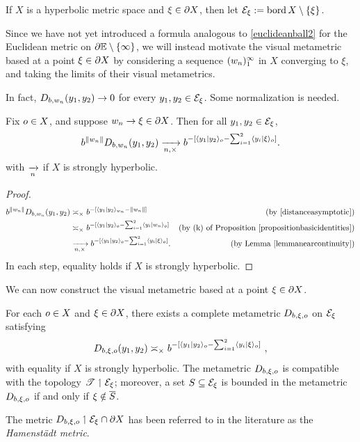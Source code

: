 \begin{notation}
If $X$ is a hyperbolic metric space and $\xi\in\partial X$, then let $\mathcal E_\xi := \operatorname{bord} X\setminus\{\xi\}$.
\end{notation}

Since we have not yet introduced a formula analogous to \eqref{euclideanball2} for the Euclidean metric on $\del\E\butnot\{\infty\}$, we will instead motivate the visual metametric based at a point $\xi\in\partial X$ by considering a sequence $(w_n)_1^\infty$ in $X$ converging to $\xi$, and taking the limits of their visual metametrics.



In fact, $D_{b,w_n}(y_1,y_2)\to 0$ for every $y_1, y_2\in\mathcal E_\xi$. Some normalization is needed.


\begin{lemma}
\label{lemmaeuclideanmetametric}
Fix $o\in X$, and suppose $w_n\to\xi\in\partial X$. Then for all $y_1, y_2\in\mathcal E_\xi$,
\[
b^{\|w_n\|} D_{b,w_n} (y_1,y_2) \xrightarrow[n,\times]{} b^{-[\langle y_1 | y_2 \rangle_o - \sum_{i = 1}^2 \langle y_i | \xi \rangle_o]} .
\]
with $\xrightarrow[n]{}$ if $X$ is strongly hyperbolic.
\end{lemma}
\begin{proof}
\begin{align*}
b^{\|w_n\|} D_{b,w_n}(y_1,y_2)
&\asymp_\times b^{-[\langle y_1 | y_2 \rangle_{w_n} - \|w_n\|]} & \textup{(by \eqref{distanceasymptotic})}\\
&\asymp_\times b^{-[\langle y_1 | y_2 \rangle_o - \sum_{i = 1}^2 \langle y_i | w_n \rangle_o]} & \textup{(by (k) of Proposition \ref{propositionbasicidentities})}\\
&\xrightarrow[n,\times]{} b^{-[\langle y_1 | y_2 \rangle_o - \sum_{i = 1}^2 \langle y_i | \xi \rangle_o]}. & \textup{(by Lemma \ref{lemmanearcontinuity})}
\end{align*}
In each step, equality holds if $X$ is strongly hyperbolic.
\end{proof}

We can now construct the visual metametric based at a point $\xi\in\partial X$.

\begin{proposition}
\label{propositioneuclideanmetametric}
For each $o\in X$ and $\xi\in\partial X$, there exists a complete metametric $D_{b,\xi,o}$ on $\mathcal E_\xi$ satisfying
\begin{equation}
\label{euclideanmetametric}
D_{b,\xi,o}(y_1,y_2) \asymp_\times b^{-[\langle y_1 | y_2 \rangle_o - \sum_{i = 1}^2 \langle y_i | \xi \rangle_o]} \ ,
\end{equation}
with equality if $X$ is strongly hyperbolic. The metametric $D_{b,\xi,o}$ is compatible with the topology $\mathscr T\upharpoonleft\mathcal E_\xi$; moreover, a set $S\subseteq\mathcal E_\xi$ is bounded in the metametric $D_{b,\xi,o}$ if and only if $\xi\notin\overline S$.
\end{proposition}
\begin{remark}
The metric $D_{b,\xi,o}\upharpoonleft\mathcal E_\xi\cap\partial X$ has been referred to in the literature as the \emph{Hamenst\"adt metric}.
\end{remark}

